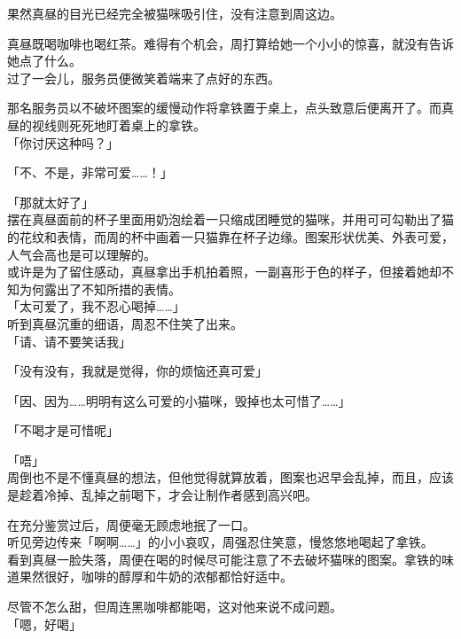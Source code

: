 果然真昼的目光已经完全被猫咪吸引住，没有注意到周这边。

真昼既喝咖啡也喝红茶。难得有个机会，周打算给她一个小小的惊喜，就没有告诉她点了什么。\\

过了一会儿，服务员便微笑着端来了点好的东西。

那名服务员以不破坏图案的缓慢动作将拿铁置于桌上，点头致意后便离开了。而真昼的视线则死死地盯着桌上的拿铁。\\

「你讨厌这种吗？」

「不、不是，非常可爱……！」

「那就太好了」\\

摆在真昼面前的杯子里面用奶泡绘着一只缩成团睡觉的猫咪，并用可可勾勒出了猫的花纹和表情，而周的杯中画着一只猫靠在杯子边缘。图案形状优美、外表可爱，人气会高也是可以理解的。\\

或许是为了留住感动，真昼拿出手机拍着照，一副喜形于色的样子，但接着她却不知为何露出了不知所措的表情。\\

「太可爱了，我不忍心喝掉……」\\

听到真昼沉重的细语，周忍不住笑了出来。\\

「请、请不要笑话我」

「没有没有，我就是觉得，你的烦恼还真可爱」

「因、因为……明明有这么可爱的小猫咪，毁掉也太可惜了……」

「不喝才是可惜呢」

「唔」\\

周倒也不是不懂真昼的想法，但他觉得就算放着，图案也迟早会乱掉，而且，应该是趁着冷掉、乱掉之前喝下，才会让制作者感到高兴吧。

在充分鉴赏过后，周便毫无顾虑地抿了一口。\\

听见旁边传来「啊啊……」的小小哀叹，周强忍住笑意，慢悠悠地喝起了拿铁。\\

看到真昼一脸失落，周便在喝的时候尽可能注意了不去破坏猫咪的图案。拿铁的味道果然很好，咖啡的醇厚和牛奶的浓郁都恰好适中。

尽管不怎么甜，但周连黑咖啡都能喝，这对他来说不成问题。\\

「嗯，好喝」\\

